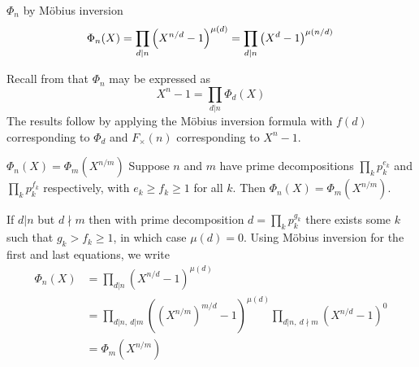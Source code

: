 \begin{lemma}{$\Phi_n$ by Möbius inversion}
    \begin{equation}
        \Phi_n(X)
        = \prod_{d|n} \left(
            X^{n/d}-1
        \right)^{\mu(d)}
        = \prod_{d|n} \left(
            X^d-1
        \right)^{\mu(n/d)} \\
    \end{equation}

    \proof
    Recall from  that $\Phi_n$ may be expressed as
    \begin{equation}
        X^n-1 = \prod_{d|n} \Phi_d(X)
    \end{equation}
    The results follow by applying the Möbius inversion formula with $f(d)$ corresponding to $\Phi_d$ and $F_\times(n)$ corresponding to $X^n-1$.
\end{lemma}

\begin{theorem}[Phi_n(X) = Phi_m(X^{n/m})]{$\Phi_n(X)=\Phi_m(X^{n/m})$}
    Suppose $n$ and $m$ have prime decompositions $\prod_k p_k^{e_k}$ and $\prod_k p_k^{f_k}$ respectively, with $e_k\geq f_k\geq 1$ for all $k$.
    Then $\Phi_n(X)=\Phi_m(X^{n/m})$.

    \proof
    If $d|n$ but $d\nmid m$ then with prime decomposition $d=\prod_k p_k^{g_k}$ there exists some $k$ such that $g_k>f_k\geq 1$, in which case $\mu(d)=0$.
    Using Möbius inversion for the first and last equations, we write
    \begin{align}
        \Phi_n(X) &= \prod_{d|n} (X^{n/d}-1)^{\mu(d)} \\
        &= \prod_{d|n,\ d|m} ((X^{n/m})^{m/d}-1)^{\mu(d)} \prod_{d|n,\ d\nmid m} (X^{n/d}-1)^0 \\
        &= \Phi_m(X^{n/m})
    \end{align}
\end{theorem}

